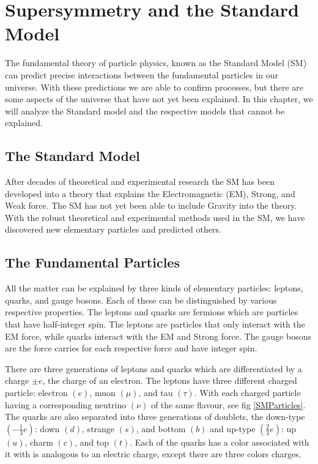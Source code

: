 \chapter{Supersymmetry and the Standard Model}
\label{ch:SUSY}

The fundamental theory of particle physics, known as the Standard Model (SM) can predict precise interactions between the fundamental particles in our universe. With these predictions we are able to confirm processes, but there are some aspects of the universe that have not yet been explained. In this chapter, we will analyze the Standard model and the respective models that cannot be explained.

\section{The Standard Model}
\label{sec:SM}

After decades of theoretical and experimental research the SM has been developed into a theory that explains the Electromagnetic (EM), Strong, and Weak force. The SM has not yet been able to include Gravity into the theory. With the robust theoretical and experimental methods used in the SM, we have discovered new elementary particles and predicted others. 

\section{The Fundamental Particles}

 All the matter can be explained by three kinds of elementary particles: leptons, quarks, and gauge bosons. Each of these can be distinguished by various respective properties. The leptons and quarks are fermions which are particles that have half-integer spin. The leptons are particles that only interact with the EM force, while quarks interact with the EM and Strong force. The gauge bosons are the force carries for each respective force and have integer spin. 
 
 There are three generations of leptons and quarks which are differentiated by a charge $\pm e$, the charge of an electron. The leptons have three different charged particle: electron $(e)$, muon $(\mu)$, and tau $(\tau)$. With each charged particle having a corresponding neutrino $(\nu)$ of the same flavour, see fig \ref{SMParticles}. The quarks are also separated into three generations of doublets, the down-type $(-\frac{1}{3}e)$: down $(d)$, strange $(s)$, and bottom $(b)$ and up-type $(\frac{2}{3}e)$: up $(u)$, charm $(c)$, and top $(t)$. Each of the quarks has a color associated with it with is analogous to an electric charge, except there are three colors charges. 

